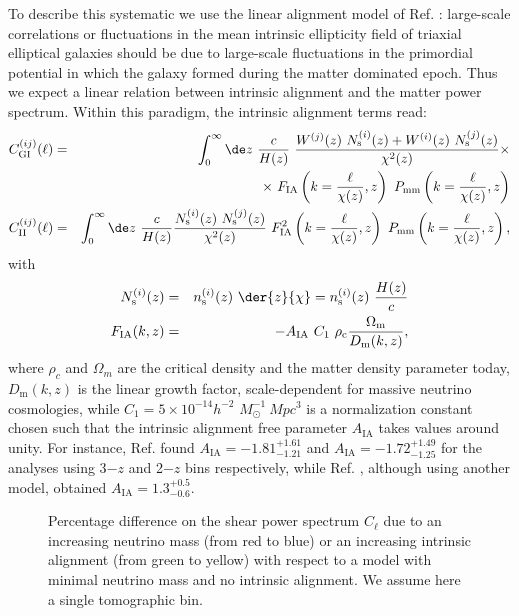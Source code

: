 \documentclass[a4paper,11pt]{article}
\begin{document}
To describe this systematic we use the linear alignment model of Ref. \cite{Hirata-IA+04}: large-scale correlations or fluctuations in the mean intrinsic ellipticity field of triaxial elliptical galaxies should be due to large-scale fluctuations in the primordial potential in which the galaxy formed during the matter dominated epoch.
Thus we expect a linear relation between intrinsic alignment and the matter power spectrum.
Within this paradigm, the intrinsic alignment terms read:
\begin{eqnarray}
C_\mathrm{GI}^{(ij)} (\ell)
&=&
\int_0^\infty \de z \ \frac{c}{H(z)} \ \frac{W^{(j)}(z) \ N_\mathrm s^{(i)}(z) + W^{(i)}(z) \ N_\mathrm s^{(j)}(z)}{\chi^2(z)} \times
\nonumber \\
&&
\times \ F_\mathrm{IA}\left(k = \frac{\ell}{\chi(z)},z\right) \ P_\mathrm{mm}\left(k = \frac{\ell}{\chi(z)}, z\right)
\label{eq:Cl_GI}
\\
C_\mathrm{II}^{(ij)} (\ell)
&=&
\int_0^\infty \de z \ \frac{c}{H(z)} \frac{N_\mathrm s^{(i)}(z) \ N_\mathrm s^{(j)}(z)}{\chi^2(z)} \ F_\mathrm{IA}^2\left(k = \frac{\ell}{\chi(z)},z\right) \ P_\mathrm{mm}\left(k = \frac{\ell}{\chi(z)}, z\right),
\label{eq:Cl_II}
\end{eqnarray}
with
\begin{eqnarray}
N_\mathrm s^{(i)}(z)  &=& n_\mathrm s^{(i)}(z) \ \der{z}{\chi} = n_\mathrm s^{(i)}(z) \ \frac{H(z)}{c}
\\
F_\mathrm{IA}(k,z) &=& -A_\mathrm{IA} \ C_1 \ \rho_\mathrm c \frac{\Omega_\mathrm m}{D_\mathrm{m}(k,z)},
\end{eqnarray}
where
$\rho_c$ and $\Omega_m$ are the critical density and the matter density parameter today, $D_\mathrm{m}(k,z)$ is the linear growth factor, scale-dependent for massive neutrino cosmologies,
while $C_1 = 5\times 10^{-14} h^{-2}$ $\unit{M_\odot^{-1} \ Mpc^3}$ is a normalization constant chosen such that the intrinsic alignment free parameter $A_\mathrm{IA}$ takes values around unity.
For instance, Ref. \cite{Koh-KiDS+17} found $A_\mathrm{IA} = -1.81^{+1.61}_{-1.21}$ and $A_\mathrm{IA} = -1.72^{+1.49}_{-1.25}$ for the  analyses using 3$-z$ and 2$-z$ bins respectively, while Ref. \cite{DES_lensing+17}, although using another model, obtained $A_\mathrm{IA}= 1.3^{+0.5}_{-0.6}$.

\begin{figure}[!t]
\caption{Percentage difference on the shear power spectrum $C_\ell$ due to  an increasing neutrino mass (from red to blue) or an increasing intrinsic alignment (from green to yellow) with respect to a model with minimal neutrino mass and no intrinsic alignment. We assume here a single tomographic bin.}
\label{fig:Mnu_vs_IA_plot}
\end{figure}
\FloatBarrier
\end{document}
